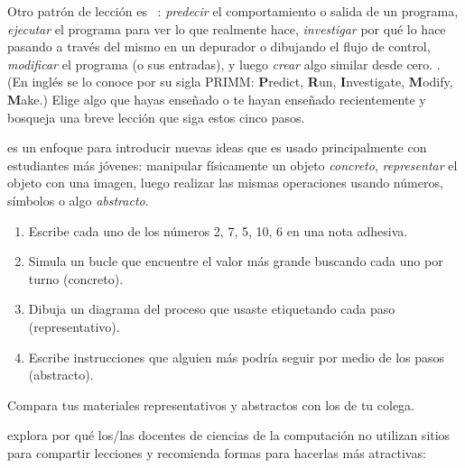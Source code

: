 Otro patrón de lección es ~\cite{Sent2019}:
\emph{predecir} el comportamiento o salida de un programa,
\emph{ejecutar} el programa para ver lo que realmente hace,
\emph{investigar} por qué lo hace pasando a través del mismo en un depurador o dibujando el flujo de control,
\emph{modificar} el programa (o sus entradas),
y luego \emph{crear} algo similar desde cero.
.
(En inglés se lo conoce por su sigla PRIMM: 
\textbf{P}redict, \textbf{R}un, \textbf{I}nvestigate, \textbf{M}odify, \textbf{M}ake.)
Elige algo que hayas enseñado o te hayan enseñado recientemente
y bosqueja una breve lección que siga estos cinco pasos.
 
 
 
 es un enfoque para introducir nuevas ideas
que es usado principalmente con estudiantes más jóvenes:
manipular físicamente un objeto \emph{concreto},
\emph{representar} el objeto con una imagen,
luego realizar las mismas operaciones
usando números, símbolos o algo \emph{abstracto}.
 \begin{enumerate}
 
\item
  Escribe cada uno de los números 2, 7, 5, 10, 6 en una nota adhesiva.
 
\item
  Simula un bucle que encuentre el valor más grande buscando cada uno por turno (concreto).
 
\item
 Dibuja un diagrama del proceso que usaste etiquetando cada paso (representativo).
 
\item
  Escribe instrucciones que alguien más podría seguir por medio de los pasos (abstracto).
\end{enumerate}
 
 
Compara tus materiales representativos y abstractos con los de tu colega.
 
 
\cite{Leak2017} explora por qué los/las docentes de ciencias de la computación
no utilizan sitios para compartir lecciones y recomienda formas para hacerlas más atractivas:
 
